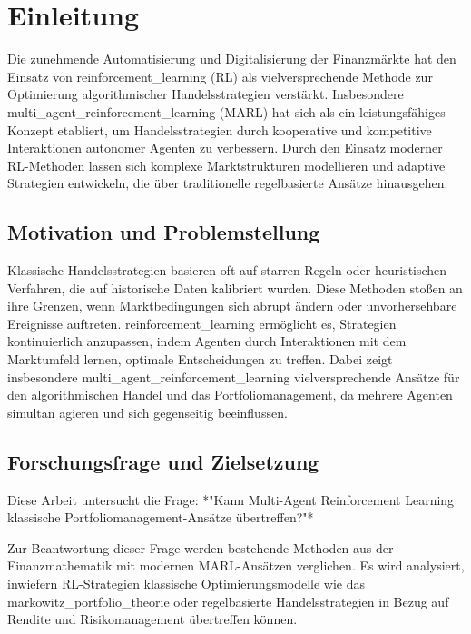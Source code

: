 \section{Einleitung}
\label{sec:einleitung}

Die zunehmende Automatisierung und Digitalisierung der Finanzmärkte hat den Einsatz von \gls{reinforcement_learning} (RL) als vielversprechende Methode zur Optimierung algorithmischer Handelsstrategien verstärkt. Insbesondere \gls{multi_agent_reinforcement_learning} (MARL) hat sich als ein leistungsfähiges Konzept etabliert, um Handelsstrategien durch kooperative und kompetitive Interaktionen autonomer Agenten zu verbessern\cite{Lowe2017}. Durch den Einsatz moderner RL-Methoden lassen sich komplexe Marktstrukturen modellieren und adaptive Strategien entwickeln, die über traditionelle regelbasierte Ansätze hinausgehen\cite{Zhang2023}.

\subsection{Motivation und Problemstellung}

Klassische Handelsstrategien basieren oft auf starren Regeln oder heuristischen Verfahren, die auf historische Daten kalibriert wurden. Diese Methoden stoßen an ihre Grenzen, wenn Marktbedingungen sich abrupt ändern oder unvorhersehbare Ereignisse auftreten. \gls{reinforcement_learning} ermöglicht es, Strategien kontinuierlich anzupassen, indem Agenten durch Interaktionen mit dem Marktumfeld lernen, optimale Entscheidungen zu treffen\cite{Thakkar2021}. Dabei zeigt insbesondere \gls{multi_agent_reinforcement_learning} vielversprechende Ansätze für den algorithmischen Handel und das Portfoliomanagement, da mehrere Agenten simultan agieren und sich gegenseitig beeinflussen\cite{Lowe2017}.

\subsection{Forschungsfrage und Zielsetzung}

Diese Arbeit untersucht die Frage:  
*"Kann Multi-Agent Reinforcement Learning klassische Portfoliomanagement-Ansätze übertreffen?"*  

Zur Beantwortung dieser Frage werden bestehende Methoden aus der Finanzmathematik mit modernen MARL-Ansätzen verglichen. Es wird analysiert, inwiefern RL-Strategien klassische Optimierungsmodelle wie das \gls{markowitz_portfolio_theorie} oder regelbasierte Handelsstrategien in Bezug auf Rendite und Risikomanagement übertreffen können.

